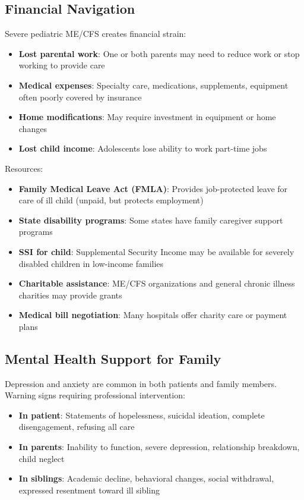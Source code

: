 \subsection{Financial Navigation}

Severe pediatric ME/CFS creates financial strain:

\begin{itemize}
    \item \textbf{Lost parental work}: One or both parents may need to reduce work or stop working to provide care
    \item \textbf{Medical expenses}: Specialty care, medications, supplements, equipment often poorly covered by insurance
    \item \textbf{Home modifications}: May require investment in equipment or home changes
    \item \textbf{Lost child income}: Adolescents lose ability to work part-time jobs
\end{itemize}

Resources:
\begin{itemize}
    \item \textbf{Family Medical Leave Act (FMLA)}: Provides job-protected leave for care of ill child (unpaid, but protects employment)
    \item \textbf{State disability programs}: Some states have family caregiver support programs
    \item \textbf{SSI for child}: Supplemental Security Income may be available for severely disabled children in low-income families
    \item \textbf{Charitable assistance}: ME/CFS organizations and general chronic illness charities may provide grants
    \item \textbf{Medical bill negotiation}: Many hospitals offer charity care or payment plans
\end{itemize}

\subsection{Mental Health Support for Family}

Depression and anxiety are common in both patients and family members. Warning signs requiring professional intervention:

\begin{itemize}
    \item \textbf{In patient}: Statements of hopelessness, suicidal ideation, complete disengagement, refusing all care
    \item \textbf{In parents}: Inability to function, severe depression, relationship breakdown, child neglect
    \item \textbf{In siblings}: Academic decline, behavioral changes, social withdrawal, expressed resentment toward ill sibling
\end{itemize}

